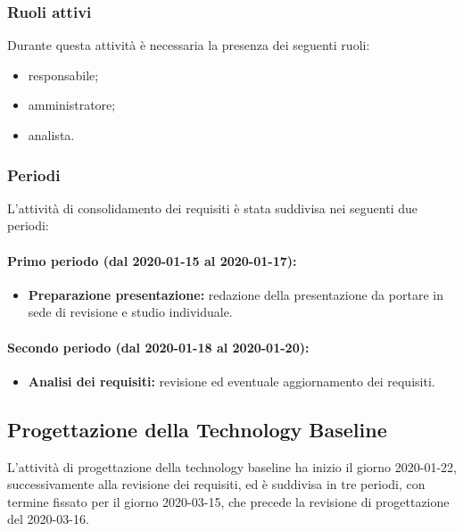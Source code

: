 			\subsubsection{Ruoli attivi}
			
				Durante questa attività è necessaria la presenza dei seguenti ruoli:
				\begin{itemize}
					\item responsabile;
					\item amministratore;
					\item analista.
				\end{itemize}
			
			\subsubsection{Periodi}
			
				L'attività di consolidamento dei requisiti è stata suddivisa nei seguenti due periodi:
				
				\paragraph{Primo periodo (dal 2020-01-15 al 2020-01-17):}
				
					\begin{itemize}
						\item \textbf{Preparazione presentazione:} redazione della presentazione da portare in sede di revisione e studio individuale.
					\end{itemize}
				
				\paragraph{Secondo periodo (dal 2020-01-18 al 2020-01-20):}
				
					\begin{itemize}
						\item \textbf{Analisi dei requisiti:} revisione ed eventuale aggiornamento dei requisiti.
					\end{itemize}

		\subsection{Progettazione della Technology Baseline}
	
			L'attività di progettazione della technology baseline ha inizio il giorno 2020-01-22, successivamente alla revisione dei requisiti, ed è suddivisa in tre periodi, con termine fissato per il giorno 2020-03-15, che precede la revisione di progettazione del 2020-03-16.
			
